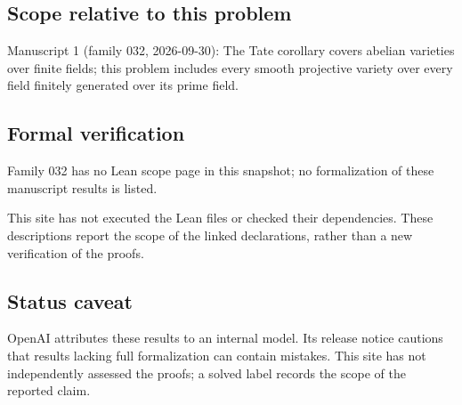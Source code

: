 \documentclass[11pt]{article}
\begin{document}
\subsection{Scope relative to this problem}
Manuscript 1 (family 032, 2026-09-30): The Tate corollary covers abelian varieties over finite fields; this problem includes every smooth projective variety over every field finitely generated over its prime field.

\subsection{Formal verification}
Family 032 has no Lean scope page in this snapshot; no formalization of these manuscript results is listed.

This site has not executed the Lean files or checked their dependencies. These descriptions report the scope of the linked declarations, rather than a new verification of the proofs.

\subsection{Status caveat}
OpenAI attributes these results to an internal model. Its release notice cautions that results lacking full formalization can contain mistakes. This site has not independently assessed the proofs; a solved label records the scope of the reported claim.
\end{document}
